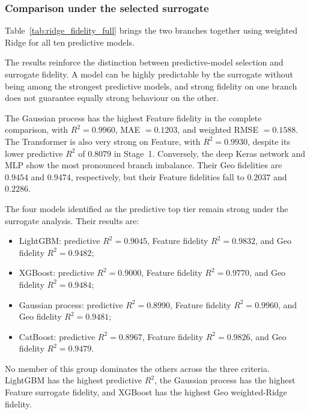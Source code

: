 \subsubsection{Comparison under the selected surrogate}
\label{sec}

Table~\ref{tab:ridge_fidelity_full} brings the two branches together using weighted Ridge for all ten predictive models.

The results reinforce the distinction between predictive-model selection and surrogate fidelity. A model can be highly predictable by the surrogate without being among the strongest predictive models, and strong fidelity on one branch does not guarantee equally strong behaviour on the other.

The Gaussian process has the highest Feature fidelity in the complete comparison, with $R^2=0.9960$, MAE $=0.1203$, and weighted RMSE $=0.1588$. The Transformer is also very strong on Feature, with $R^2=0.9930$, despite its lower predictive $R^2$ of $0.8079$ in Stage~1. Conversely, the deep Keras network and MLP show the most pronounced branch imbalance. Their Geo fidelities are $0.9454$ and $0.9474$, respectively, but their Feature fidelities fall to $0.2037$ and $0.2286$.

The four models identified as the predictive top tier remain strong under the surrogate analysis. Their results are:

\begin{itemize}

\item LightGBM: predictive $R^2=0.9045$, Feature fidelity $R^2=0.9832$, and Geo fidelity $R^2=0.9482$;

\item XGBoost: predictive $R^2=0.9000$, Feature fidelity $R^2=0.9770$, and Geo fidelity $R^2=0.9484$;

\item Gaussian process: predictive $R^2=0.8990$, Feature fidelity $R^2=0.9960$, and Geo fidelity $R^2=0.9481$;

\item CatBoost: predictive $R^2=0.8967$, Feature fidelity $R^2=0.9826$, and Geo fidelity $R^2=0.9479$.

\end{itemize}

No member of this group dominates the others across the three criteria. LightGBM has the highest predictive $R^2$, the Gaussian process has the highest Feature surrogate fidelity, and XGBoost has the highest Geo weighted-Ridge fidelity.

